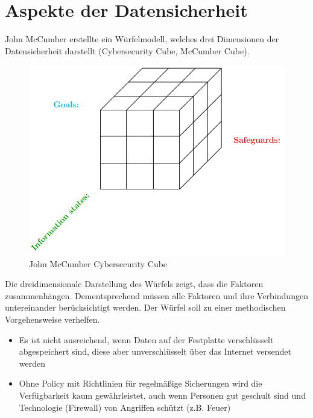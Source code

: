 \chapter{Aspekte der Datensicherheit}
John McCumber erstellte ein Würfelmodell, welches drei Dimensionen der Datensicherheit darstellt (Cybersecurity Cube, McCumber Cube).

\begin{figure}[H]
	\centering
	\includegraphics[width=1.0\linewidth]{figures/mccumbercube.png}
	\caption{John McCumber Cybersecurity Cube}
\end{figure}

Die dreidimensionale Darstellung des Würfels zeigt, dass die Faktoren zusammenhängen. Dementsprechend müssen alle Faktoren und ihre Verbindungen untereinander berücksichtigt werden. Der Würfel soll zu einer methodischen Vorgehensweise verhelfen.
\begin{itemize}
	\item Es ist nicht ausreichend, wenn Daten auf der Festplatte verschlüsselt abgespeichert sind, diese aber unverschlüsselt über das Internet versendet werden
	\item Ohne Policy mit Richtlinien für regelmäßige Sicherungen wird die Verfügbarkeit kaum gewährleistet, auch wenn Personen gut geschult sind und Technologie (Firewall) von Angriffen schützt (z.B. Feuer)
\end{itemize}

